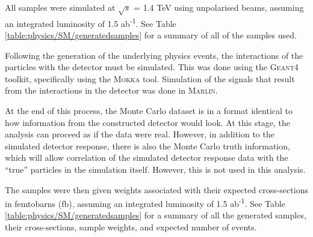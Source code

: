 All samples were simulated at $\sqrt{s}$ = 1.4 TeV using unpolarised beams, assuming an integrated luminosity of 1.5 ab\textsuperscript{-1}. See Table \ref{table:physics/SM/generatedsamples} for a summary of all of the samples used. 

Following the generation of the underlying physics events, the interactions of the particles with the detector must be simulated. This was done using the \textsc{Geant4} toolkit\cite{geant4}, specifically using the \textsc{Mokka}  tool. Simulation of the signals that result from the interactions in the detector was done in \textsc{Marlin}\cite{marlin}.

At the end of this process, the Monte Carlo dataset is in a format identical to how information from the constructed detector would look. At this stage, the analysis can proceed as if the data were real. However, in addition to the simulated detector response, there is also the Monte Carlo truth information, which will allow correlation of the simulated detector response data with the ``true'' particles in the simulation itself. However, this is not used in this analysis.

The samples were then given weights associated with their expected cross-sections in femtobarns (fb), assuming an integrated luminosity of 1.5 ab\textsuperscript{-1}. See Table \ref{table:physics/SM/generatedsamples} for a summary of all the generated samples, their cross-sections, sample weights, and expected number of events. 

